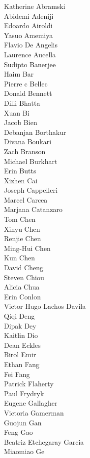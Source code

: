 Katherine Abramski\\
Abidemi Adeniji\\
Edoardo Airoldi\\
Yasuo Amemiya\\
Flavio De Angelis\\
Laurence Aucella\\
Sudipto Banerjee\\
Haim Bar\\
Pierre c Bellec\\
Donald Bennett\\
Dilli Bhatta\\
Xuan Bi\\
Jacob Bien\\
Debanjan Borthakur\\
Divana Boukari\\
Zach Branson\\
Michael Burkhart\\
Erin Butts\\
Xizhen Cai\\
Joseph Cappelleri\\
Marcel Carcea\\
Marjana Catanzaro\\
Tom Chen\\
Xinyu Chen\\
Renjie Chen\\
Ming-Hui  Chen\\
Kun Chen\\
David Cheng\\
Steven Chiou\\
Alicia Chua\\
Erin Conlon\\
Victor Hugo Lachos Davila\\
Qiqi  Deng\\
Dipak Dey\\
Kaitlin Dio\\
Dean Eckles\\
Birol Emir\\
Ethan Fang\\
Fei Fang\\
Patrick Flaherty\\
Paul Frydryk\\
Eugene Gallagher\\
Victoria Gamerman\\
Guojun  Gan\\
Feng Gao\\
Beatriz Etchegaray Garcia\\
Miaomiao Ge\\
